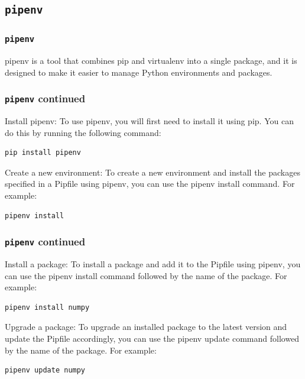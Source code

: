 \documentclass{beamer}
\begin{document}
\subsection{\texttt{pipenv}}
\begin{frame}
  \frametitle{\texttt{pipenv}}

  pipenv is a tool that combines pip and virtualenv into a single package, and it is designed to make it easier to manage Python environments and packages.

\end{frame}

\begin{frame}[fragile]
  \frametitle{\texttt{pipenv} continued}

  Install pipenv: To use pipenv, you will first need to install it using pip. You can do this by running the following command:

  \begin{lstlisting}
pip install pipenv
\end{lstlisting}

  Create a new environment: To create a new environment and install the packages specified in a Pipfile using pipenv, you can use the pipenv install command. For example:
  \begin{lstlisting}
pipenv install
\end{lstlisting}

\end{frame}

\begin{frame}[fragile]
  \frametitle{\texttt{pipenv} continued}

  Install a package: To install a package and add it to the Pipfile using pipenv, you can use the pipenv install command followed by the name of the package. For example:

  \begin{lstlisting}
pipenv install numpy
\end{lstlisting}

  Upgrade a package: To upgrade an installed package to the latest version and update the Pipfile accordingly, you can use the pipenv update command followed by the name of the package. For example:

  \begin{lstlisting}
pipenv update numpy
\end{lstlisting}

\end{frame}
\end{document}
